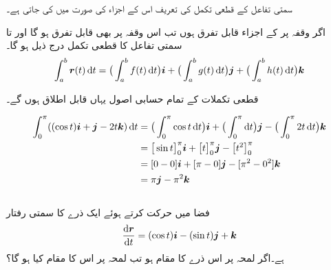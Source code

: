 سمتی تفاعل کے قطعی تکمل کی تعریف اس کے اجزاء کی صورت میں کی  جاتی ہے۔

اگر وقفہ  پر  کے اجزاء قابل تفرق ہوں تب اس وقفہ پر  بھی قابل تفرق ہو گا اور  تا   سمتی تفاعل  کا قطعی تکمل درج ذیل ہو گا۔
\begin{align*}
\int_a^b\kvec{r}(t)\dif t=\big(\int_a^b f(t)\dif t\big)\ai+\big(\int_a^b g(t)\dif t\big)\aj+\big(\int_a^b h(t)\dif t\big)\ak
\end{align*}

قطعی تکملات کے تمام حسابی  اصول یہاں قابل اطلاق ہوں گے۔

\begin{align*}
\int_0^{\pi}((\cos t)\ai+\aj-2t\ak)\dif t&=\big(\int_0^{\pi}\cos t\dif t \big)\ai+\big(\int_0^{\pi}\dif t \big)\aj-\big(\int_0^{\pi}2t\dif t \big)\ak\\
&=\big[\sin t\big]_0^{\pi}\ai+\big[t\big]_0^{\pi}\aj-\big[t^2\big]_0^{\pi}\\
&=[0-0]\ai+[\pi-0]\aj-[\pi^2-0^2]\ak\\
&=\pi \aj-\pi^2\ak
\end{align*}
\\
فضا  میں حرکت کرتے ہوئے ایک  ذرے کا سمتی رفتار
\begin{align*}
\frac{\dif \kvec{r}}{\dif t}=(\cos t)\ai-(\sin t)\aj+\ak
\end{align*}
ہے۔اگر  لمحہ  پر اس ذرے کا مقام  ہو تب لمحہ  پر اس کا مقام کیا ہو گا؟

